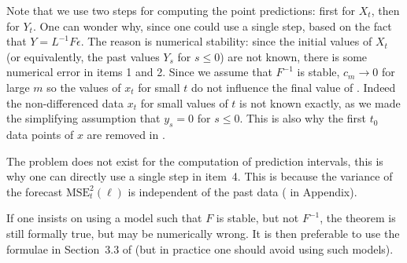 Note that we use two steps for computing the point predictions:
first for $X_t$, then for $Y_t$. One can wonder why, since one
could use a single step, based on the fact that $Y = L^{-1}F
\epsilon$. The reason is numerical stability: since the initial
values of $X_t$ (or equivalently, the past values $Y_s$ for
$s\leq 0$) are not known, there is some numerical error in
items 1 and 2. Since we assume that $F^{-1}$ is stable, $c_m
\to 0$ for large $m$ so the values of $x_t$ for small $t$ do
not influence the final value of . Indeed
the non-differenced data $x_t$ for small values of $t$ is not
known exactly, as we made the simplifying assumption that
$y_s=0$ for $s\leq 0$. This is also why the first $t_0$ data
points of $x$ are  removed in
. %

The problem does not exist for the computation of
prediction intervals, this is why one can directly use
a single step in item~4. This is because the variance
of the forecast $\mbox{MSE}^2_t(\ell)$ is independent
of the past data ( in Appendix).

If one insists on using a model such that $F$ is stable, but not
$F^{-1}$, the theorem is still formally true, but may be numerically
wrong. It is then preferable to use the formulae in Section~3.3 of
\cite{BrockwellDavis02-book} (but in practice one should avoid using
such models).

%
%


